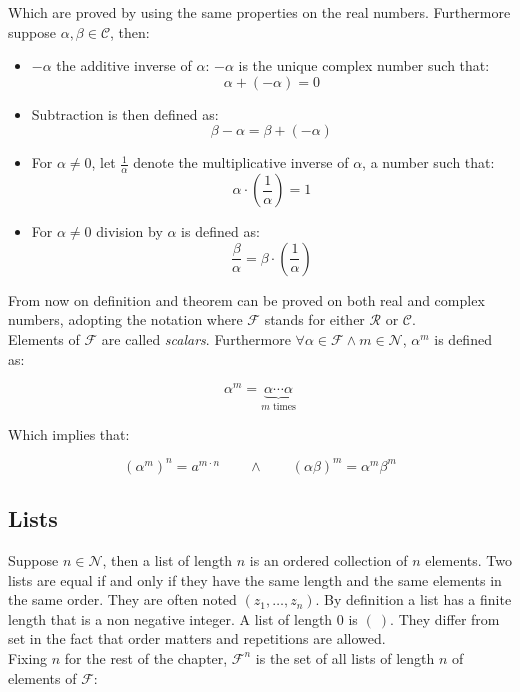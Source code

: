   Which are proved by using the same properties on the real numbers.
  Furthermore suppose $\alpha,\beta\in\mathcal{C}$, then:

  \begin{multicols}{2}
    \begin{itemize}
      \item $-\alpha$ the additive inverse of $\alpha$: $-\alpha$ is the unique complex number such that:
        $$\alpha+(-\alpha) = 0$$
      \item Subtraction is then defined as:
        $$\beta - \alpha = \beta + (-\alpha)$$
      \item For $\alpha\neq 0$, let $\frac{1}{\alpha}$ denote the multiplicative inverse of $\alpha$, a number such that:
        $$\alpha\cdot\left(\frac{1}{\alpha}\right) = 1$$
      \item For $\alpha\neq 0$ division by $\alpha$ is defined as:
        $$\frac{\beta}{\alpha} = \beta\cdot\left(\frac{1}{\alpha}\right)$$
    \end{itemize}
  \end{multicols}

  From now on definition and theorem can be proved on both real and complex numbers, adopting the notation where $\mathcal{F}$ stands for either $\mathcal{R}$ or $\mathcal{C}$.\\
  Elements of $\mathcal{F}$ are called \emph{scalars}.
  Furthermore $\forall\alpha\in\mathcal{F}\land m\in\mathcal{N}$, $\alpha^m$ is defined as:

  $$\alpha^m = \underbrace{\alpha\cdots\alpha}_{m\text{ times}}$$

  Which implies that:

  $$(\alpha^m)^n = a^{m\cdot n}\qquad\land\qquad(\alpha\beta)^m = \alpha^m\beta^m$$

  \subsection{Lists}
  Suppose $n\in\mathcal{N}$, then a list of length $n$ is an ordered collection of $n$ elements.
  Two lists are equal if and only if they have the same length and the same elements in the same order.
  They are often noted $(z_1, \dots, z_n)$.
  By definition a list has a finite length that is a non negative integer.
  A list of length $0$ is $(\ )$.
  They differ from set in the fact that order matters and repetitions are allowed.\\

  Fixing $n$ for the rest of the chapter, $\mathcal{F}^n$ is the set of all lists of length $n$ of elements of $\mathcal{F}$:

